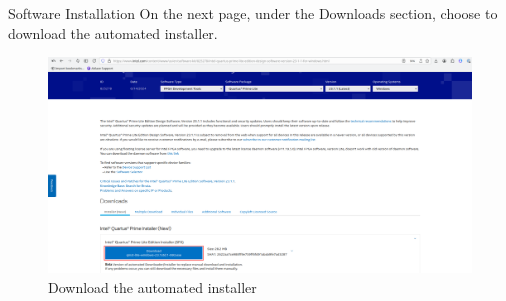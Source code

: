 \documentclass[fleqn]{beamer}
\begin{document}
\begin{frame}{Software Installation}
    On the next page, under the Downloads section, choose to download the automated installer.
    \begin{figure}
        \centering
        \includegraphics[width=1\linewidth]{setup_guide//figures/auto_installer.png}
        \caption{Download the automated installer}
        \label{fig:enter-label}
    \end{figure}
\end{frame}
\end{document}
